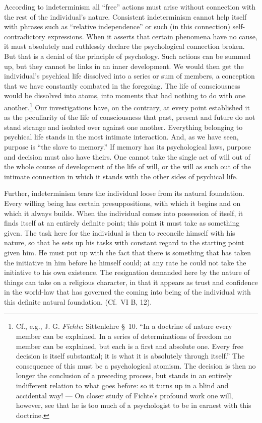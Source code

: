 \documentclass[12pt,a4paper]{book}
\newcommand{\opage}[1]{\marginnote{\footnotesize\textit{[#1]}}}
\begin{document}
According to indeterminism all ``free'' actions must arise without
connection with the rest of the individual's nature. Consistent
indeterminism cannot help itself with phrases such as ``relative
independence'' or such (in this connection) self-contradictory
expressions. When it asserts that certain phenomena have no cause, it
must absolutely and ruthlessly declare the psychological connection
broken. But that is a denial of the principle of psychology. Such actions
can be summed up, but they cannot be links in an inner development. We
would then get the individual's psychical life dissolved into a series or
sum of members, a conception that we have constantly combated in the
foregoing. The life of consciousness would be dissolved into atoms, into
moments that had nothing to do with one
another.\footnote{Cf., e.g., J. G. \emph{Fichte}: Sittenlehre §~10.
``In a doctrine of nature every member can be explained. In a series of
determinations of freedom no member can be explained, but each is a first
and absolute one. Every free decision is itself substantial; it is what
it is absolutely through itself.'' The consequence of this must be a
psychological atomism. The decision is then no longer the conclusion of a
preceding process, but stands in an entirely indifferent relation to what
goes before: so it turns up in a blind and accidental way! --- On closer
study of Fichte's profound work one will, however, see that he is too
much of a psychologist to be in earnest with this doctrine.} Our
investigations have, on the contrary, at every point established it as
the peculiarity of the life of consciousness that past, present and future
do not stand strange and isolated over against one another. Everything
belonging to psychical life stands in the most intimate interaction. And,
as we have seen, purpose is ``the slave to memory.'' If memory has its
psychological laws, purpose and decision must also have theirs. One cannot
take the single act of will out of the whole course of development of the
life of will, or the will as such out of the intimate connection in which
it stands with the other sides of psychical life.

Further, indeterminism tears the individual loose from its natural
foundation. Every willing being has certain
\opage{403}presuppositions, with which it begins and on which it always
builds. When the individual comes into possession of itself, it finds
itself at an entirely definite point; this point it must take as something
given. The task here for the individual is then to reconcile himself with
his nature, so that he sets up his tasks with constant regard to the
starting point given him. He must put up with the fact that there is
something that has taken the initiative in him before he himself could; at
any rate he could not take the initiative to his own existence. The
resignation demanded here by the nature of things can take on a religious
character, in that it appears as trust and confidence in the world-law
that has governed the coming into being of the individual with this
definite natural foundation. (Cf.\ VI B, 12).
\end{document}
